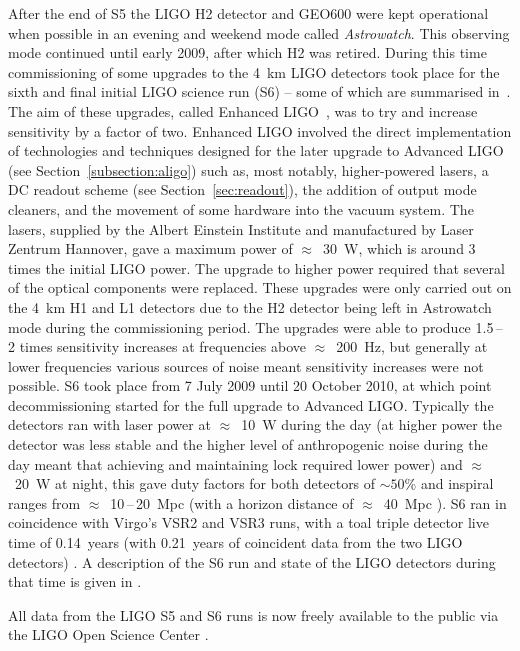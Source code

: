 After the end of S5 the LIGO H2 detector and GEO600 were kept operational when possible in an evening and 
weekend mode called \textit{Astrowatch}. This observing mode continued until early 2009, after which H2 was 
retired. During this time commissioning of some upgrades to the 4~km LIGO detectors took place for the sixth 
and final initial LIGO science run (S6) -- some of which are summarised in~\cite{Whitcomb:2008}. The aim of 
these upgrades, called Enhanced LIGO~\cite{EnhancedLIGO}, was to try and increase sensitivity by a factor of 
two. Enhanced LIGO involved the direct implementation of technologies and techniques designed for the later
upgrade to Advanced LIGO (see Section~\ref{subsection:aligo}) such as, most notably, higher-powered lasers, a 
DC readout scheme (see Section~\ref{sec:readout}), the addition of output mode cleaners, and the movement of 
some hardware into the vacuum system. The lasers, supplied by the Albert Einstein Institute and manufactured 
by Laser Zentrum Hannover, gave a maximum power of $\approx$~30~W, which is around 3 times the initial LIGO 
power. The upgrade to higher power required that several of the optical components were replaced. 
These upgrades were only carried out on the 4~km H1 and L1 detectors due to the H2 detector being left in 
Astrowatch mode during the commissioning period. The upgrades were able to produce 1.5\,--\,2 times 
sensitivity increases at frequencies above $\approx$~200~Hz, but generally at lower frequencies various 
sources of noise meant sensitivity increases were not possible. S6 took place from 7 July 2009
until 20 October 2010, at which point decommissioning started for the full upgrade to Advanced LIGO. 
Typically the detectors ran with laser power at $\approx$~10~W during the day (at higher power the detector
was less stable and the higher level of anthropogenic noise during the day meant that achieving and 
maintaining lock required lower power) and $\approx$~20~W at night, this gave duty factors for both 
detectors of $\sim 50$\% and inspiral ranges from $\approx$~10\,--\,20~Mpc (with a horizon distance of 
$\approx$~40~Mpc \cite{2012PhRvD..85h2002A}). S6 ran in coincidence with Virgo's VSR2 and VSR3 runs, with a 
toal triple detector live time of 0.14~years (with 0.21~years of coincident data from the two LIGO detectors) 
\cite{2012PhRvD..85h2002A}. A description of the S6 run and state of the LIGO detectors during that time is 
given in \cite{2015CQGra..32k5012A}.

All data from the LIGO S5 \cite{LOSCS5} and S6 \cite{LOSCS6} runs is now freely available to the public via 
the LIGO Open Science Center \cite{LOSC, 2015JPhCS.610a2021V}.

